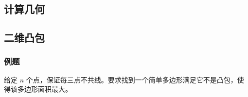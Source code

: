 \documentclass[10pt]{ctexart}
\begin{document}
\begin{multicols}{3}
    \section{计算几何}\label{ux8ba1ux7b97ux51e0ux4f55}

    \subsection{二维凸包}\label{ux4e8cux7ef4ux51f8ux5305}

    \subsubsection{例题}\label{ux4f8bux9898-8}

    给定 \(n\)
    个点，保证每三点不共线。要求找到一个简单多边形满足它不是凸包，使得该多边形面积最大。


\end{multicols}
\end{document}
